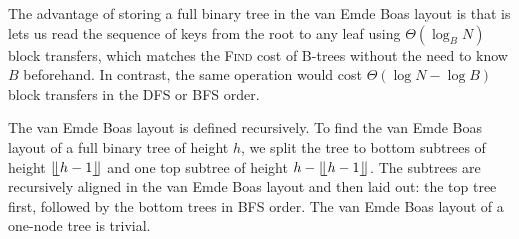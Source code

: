 The advantage of storing a full binary tree in the van Emde Boas layout
is that is lets us read the sequence of keys from the root to any leaf
using $\Theta(\log_B N)$ block transfers, which matches the \textsc{Find}
cost of B-trees without the need to know $B$ beforehand.
In contrast, the same operation would cost $\Theta(\log N-\log B)$ block
transfers in the DFS or BFS order.

The van Emde Boas layout is defined recursively. To find the van Emde Boas layout
of a full binary tree of height $h$, we split the tree to bottom subtrees
of height $\lfloor \kern -0.22em \lfloor h-1 \rfloor \kern -0.22em \rfloor$ and one top subtree of height $h - \lfloor \kern -0.22em \lfloor
h-1 \rfloor \kern -0.22em \rfloor$.
The subtrees are recursively aligned in the van Emde Boas layout and then laid
out: the top tree first, followed by the bottom trees in BFS order.
The van Emde Boas layout of a one-node tree is trivial.

